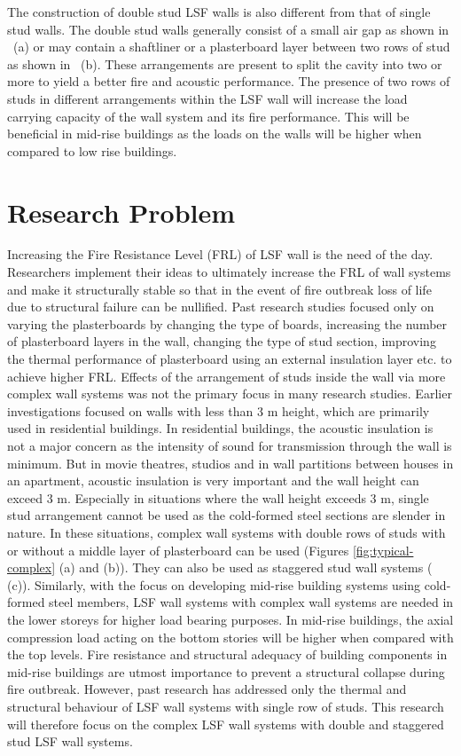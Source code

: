 The construction of double stud LSF walls is also different from that of single stud walls. The double stud walls generally consist of a small air gap as shown in ~(a) or may contain a shaftliner or a plasterboard layer between two rows of stud as shown in ~(b). These arrangements are present to split the cavity into two or more to yield a better fire and acoustic performance. The presence of two rows of studs in different arrangements within the LSF wall will increase the load carrying capacity of the wall system and its fire performance. This will be beneficial in mid-rise buildings as the loads on the walls will be higher when compared to low rise buildings.

\section{Research Problem}

Increasing the Fire Resistance Level (FRL) of LSF wall is the need of the day. Researchers implement their ideas to ultimately increase the FRL of wall systems and make it structurally stable so that in the event of fire outbreak loss of life due to structural failure can be nullified. Past research studies focused only on varying the plasterboards by changing the type of boards, increasing the number of plasterboard layers in the wall, changing the type of stud section, improving the thermal performance of plasterboard using an external insulation layer etc. to achieve higher FRL. Effects of the arrangement of studs inside the wall via more complex wall systems was not the primary focus in many research studies. Earlier investigations focused on walls with less than 3 m height, which are primarily used in residential buildings. In residential buildings, the acoustic insulation is not a major concern as the intensity of sound for transmission through the wall is minimum. But in movie theatres, studios and in wall partitions between houses in an apartment, acoustic insulation is very important and the wall height can exceed 3 m. Especially in situations where the wall height exceeds 3 m, single stud arrangement cannot be used as the cold-formed steel sections are slender in nature. In these situations, complex wall systems with double rows of studs with or without a middle layer of plasterboard can be used (Figures \ref{fig:typical-complex} (a) and (b)). They can also be used as staggered stud wall systems ( (c)). Similarly, with the focus on developing mid-rise building systems using cold-formed steel members, LSF wall systems with complex wall systems are needed in the lower storeys for higher load bearing purposes. In mid-rise buildings, the axial compression load acting on the bottom stories will be higher when compared with the top levels. Fire resistance and structural adequacy of building components in mid-rise buildings are utmost importance to prevent a structural collapse during fire outbreak. However, past research has addressed only the thermal and structural behaviour of LSF wall systems with single row of studs. This research will therefore focus on the complex LSF wall systems with double and staggered stud LSF wall systems. 

